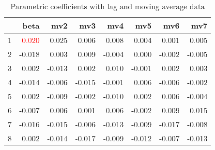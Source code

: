 \documentclass[a4paper, 12pt]{article}
\begin{document}
\begin{table}[h]
\centering
\caption{Parametric coefficients with lag and moving average data}
\begin{tabular}{rrrrrrrr}
  \hline
 & beta & mv2 & mv3 & mv4 & mv5 & mv6 & mv7 \\
  \hline
1 & \textcolor{red}{0.020} & 0.025 & 0.006 & 0.008 & 0.004 & 0.001 & 0.005 \\
  2 & -0.018 & 0.003 & 0.009 & -0.004 & 0.000 & -0.002 & -0.005 \\
  3 & 0.002 & -0.013 & 0.002 & 0.010 & -0.001 & 0.002 & 0.003 \\
  4 & -0.014 & -0.006 & -0.015 & -0.001 & 0.006 & -0.006 & -0.002 \\
  5 & 0.002 & -0.009 & -0.002 & -0.010 & 0.002 & 0.006 & -0.004 \\
  6 & -0.007 & 0.006 & 0.001 & 0.006 & -0.002 & 0.009 & 0.015 \\
  7 & -0.016 & -0.015 & -0.006 & -0.013 & -0.009 & -0.017 & -0.008 \\
  8 & 0.002 & -0.014 & -0.017 & -0.009 & -0.012 & -0.007 & -0.013 \\
   \hline
\end{tabular}
\end{table}
\clearpage
\end{document}
